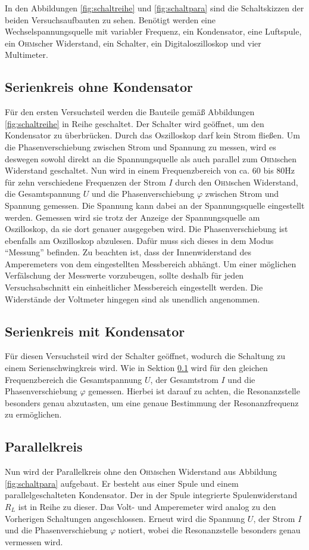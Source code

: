 \documentclass[12pt,a4paper,titlepage,headinclude]{scrartcl}
\numberwithin{equation}{section}
\newcommand{\person}[1]{\textsc{#1}}
\begin{document}
In den Abbildungen \ref{fig:schaltreihe} und \ref{fig:schaltpara} sind die Schaltskizzen der beiden Versuchsaufbauten zu sehen. Benötigt werden eine Wechselspannungsquelle mit variabler Frequenz, ein Kondensator, eine Luftspule, ein \person{Ohm}scher Widerstand, ein Schalter, ein Digitaloszilloskop und vier Multimeter. 
\subsection{Serienkreis ohne Kondensator}
\label{sec:serie1}
Für den ersten Versuchsteil werden die Bauteile gemäß Abbildungen \ref{fig:schaltreihe} in Reihe geschaltet. Der Schalter wird geöffnet, um den Kondensator zu überbrücken. Durch das Oszilloskop darf kein Strom fließen. Um die Phasenverschiebung zwischen Strom und Spannung zu messen, wird es deswegen sowohl direkt an die Spannungsquelle als auch parallel zum \person{Ohm}schen Widerstand geschaltet. Nun wird in einem Frequenzbereich von ca. 60 bis 80\;Hz für zehn verschiedene Frequenzen der Strom $I$ durch den \person{Ohm}schen Widerstand, die Gesamtspannung $U$ und die Phasenverschiebung  $\varphi$ zwischen Strom und Spannung gemessen. Die Spannung kann dabei an der Spannungsquelle eingestellt werden. Gemessen wird sie trotz der Anzeige der Spannungsquelle am Oszilloskop, da sie dort genauer ausgegeben wird. Die Phasenverschiebung ist ebenfalls am Oszilloskop abzulesen. Dafür muss sich dieses in dem Modus "`Messung"' befinden. Zu beachten ist, dass der Innenwiderstand des Amperemeters von dem eingestellten Messbereich abhängt. Um einer möglichen Verfälschung der Messwerte vorzubeugen, sollte deshalb für jeden Versuchsabschnitt ein einheitlicher Messbereich eingestellt werden. Die Widerstände der Voltmeter hingegen sind als unendlich angenommen.

\subsection{Serienkreis mit Kondensator}
Für diesen Versuchsteil wird der Schalter geöffnet, wodurch die Schaltung zu einem Serienschwingkreis wird. Wie in Sektion \ref{sec:serie1} wird für den gleichen Frequenzbereich die Gesamtspannung $U$, der Gesamtstrom $I$ und die Phasenverschiebung $\varphi$ gemessen. Hierbei ist darauf zu achten, die Resonanzstelle besonders genau abzutasten, um eine genaue Bestimmung der Resonanzfrequenz zu ermöglichen.

\subsection{Parallelkreis}
Nun wird der Parallelkreis ohne den \person{Ohm}schen Widerstand aus Abbildung \ref{fig:schaltpara} aufgebaut. Er besteht aus einer Spule  und einem parallelgeschalteten Kondensator. Der in der Spule integrierte Spulenwiderstand $R_L$ ist in Reihe zu dieser. Das Volt- und Amperemeter wird analog zu den Vorherigen Schaltungen angeschlossen. Erneut wird die Spannung $U$, der Strom $I$ und die Phasenverschiebung $\varphi$ notiert, wobei die Resonanzstelle besonders genau vermessen wird.
\end{document}
